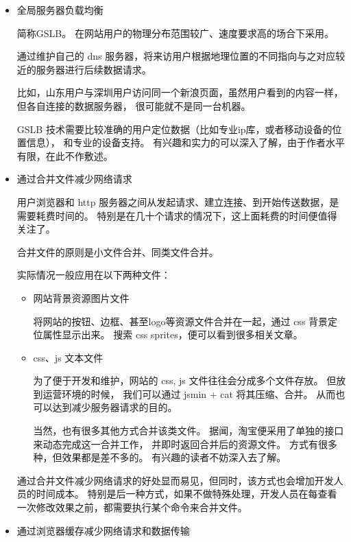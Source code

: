 \documentclass{article}
\begin{document}
  \begin{itemize}
  \item 全局服务器负载均衡

    简称GSLB。 在网站用户的物理分布范围较广、速度要求高的场合下采用。

    通过维护自己的 dns 服务器，将来访用户根据地理位置的不同指向与之对应较近的服务器进行后续数据请求。

    比如，山东用户与深圳用户访问同一个新浪页面，虽然用户看到的内容一样，但各自连接的数据服务器，
    很可能就不是同一台机器。

    GSLB 技术需要比较准确的用户定位数据（比如专业ip库，或者移动设备的位置信息），
    和专业的设备支持。 有兴趣和实力的可以深入了解，由于作者水平有限，在此不作敷述。
   
  \item 通过合并文件减少网络请求

    用户浏览器和 http 服务器之间从发起请求、建立连接、到开始传送数据，是需要耗费时间的。
    特别是在几十个请求的情况下，这上面耗费的时间便值得关注了。

    合并文件的原则是小文件合并、同类文件合并。

    实际情况一般应用在以下两种文件：

    \begin{itemize}
    \item 网站背景资源图片文件

      将网站的按钮、边框、甚至logo等资源文件合并在一起，通过 css 背景定位属性显示出来。
      搜索 css sprites，便可以看到很多相关文章。
      
    \item css、js 文本文件

      为了便于开发和维护，网站的 css, js 文件往往会分成多个文件存放。 但放到运营环境的时候，
      我们可以通过 jsmin + cat 将其压缩、合并。 从而也可以达到减少服务器请求的目的。

      当然，也有很多其他方式合并该类文件。 据闻，淘宝便采用了单独的接口来动态完成这一合并工作，
      并即时返回合并后的资源文件。 方式有很多种，但效果都是差不多的。 有兴趣的读者不妨深入去了解。
    \end{itemize}

    通过合并文件减少网络请求的好处显而易见，但同时，该方式也会增加开发人员的时间成本。
    特别是后一种方式，如果不做特殊处理，开发人员在每查看一次修改效果之前，都需要执行某个命令来合并文件。
    
  \item 通过浏览器缓存减少网络请求和数据传输


\end{itemize}
\end{document}

